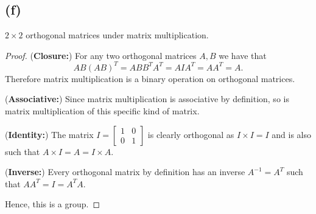 \documentclass{article}
\begin{document}
\subsection*{(f)}
$2 \times 2$ orthogonal matrices under matrix multiplication.

\begin{proof}

    (\textbf{Closure:})
    For any two orthogonal matrices $A,B$ we have that
    \begin{equation*}
        AB(AB)^T = ABB^TA^T = AIA^T = AA^T = A.
    \end{equation*}
    Therefore matrix multiplication is a binary operation on orthogonal matrices.

    (\textbf{Associative:}) Since matrix multiplication is associative by definition, so is
    matrix multiplication of this specific kind of matrix.

    (\textbf{Identity:}) The matrix $I = \begin{bmatrix}
            1 & 0 \\
            0 & 1
        \end{bmatrix}$ is clearly orthogonal as $I \times I = I$
    and is also such that $A\times I = A = I \times A$.

    (\textbf{Inverse:}) Every orthogonal matrix by definition has an inverse
    $A^{-1} = A^T$ such that $AA^T = I = A^T A$.

    Hence, this is a group.
\end{proof}
\end{document}
